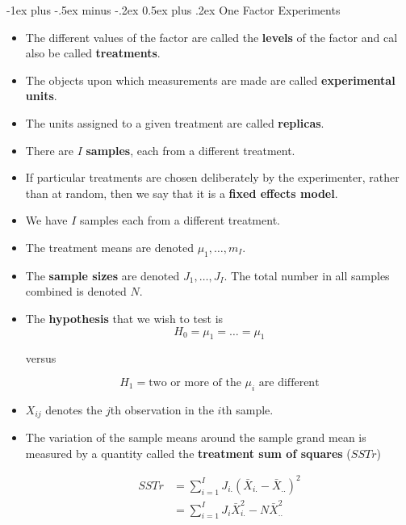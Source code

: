 \documentclass[9pt,landscape]{memoir}
\makeatletter
\renewcommand{\section}{\@startsection{section}{1}{0mm}%
    {-1ex plus -.5ex minus -.2ex}%
    {0.5ex plus .2ex}%
{\normalfont\large\bfseries}}
\makeatother
\begin{document}
\raggedright
\footnotesize
\begin{multicols}{3}
    \section{One Factor Experiments}
    \begin{itemize}
        \item The different values of the factor are called the \textbf{levels} of the factor and cal also be called \textbf{treatments}.
        \item The objects upon which measurements are made are called \textbf{experimental units}.
        \item The units assigned to a given treatment are called \textbf{replicas}.
        \item There are $I$ \textbf{samples}, each from a different treatment.
        \item If particular treatments are chosen deliberately by the experimenter, rather than at random, then we say that it is a \textbf{fixed effects model}.
        \item We have $I$ samples each from a different treatment.
        \item The treatment means are denoted $\mu_1, \ldots, m_I$.
        \item The \textbf{sample sizes} are denoted $J_1, \ldots, J_I$. The total number in all samples combined is denoted $N$.
        \item The \textbf{hypothesis} that we wish to test is
            \begin{equation*}
                H_0 = \mu_1 = \ldots = \mu_1
            \end{equation*}

            versus

            \begin{equation*}
                H_1 = \text{two or more of the $\mu_i$ are different}
            \end{equation*}

        \item $X_{ij}$ denotes the $j$th observation in the $i$th sample.
        \item The variation of the sample means around the sample grand mean is measured by a quantity called the \textbf{treatment sum of squares} ($SSTr$)

            \begin{align*}
                SSTr &= \sum_{i = 1} ^I J_{i.} {(\bar{X}_{i.} - \bar{X}_{..})}^2 \\
                     &= \sum_{i = 1} ^I J_i \bar{X}_{i.}^2 - N \bar{X}_{..}^2
            \end{align*}


\end{itemize}
\end{multicols}
\end{document}

